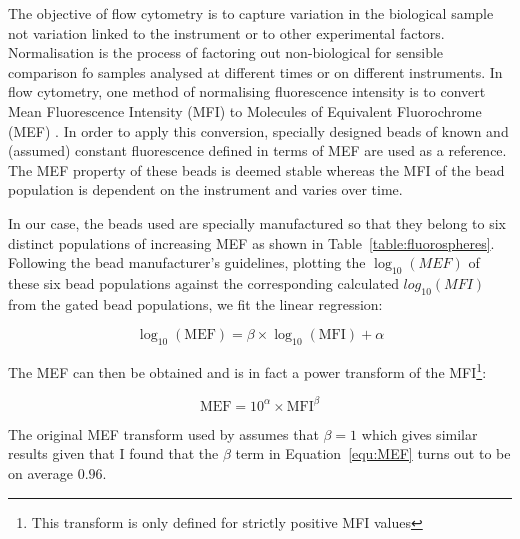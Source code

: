 
The objective of flow cytometry is to capture variation in the biological sample not variation linked to the instrument or to other experimental factors.
Normalisation is the process of factoring out non-biological for sensible comparison fo samples analysed at different times or on different instruments.
In flow cytometry, one method of normalising fluorescence intensity is to convert Mean Fluorescence Intensity (MFI)
to Molecules of Equivalent Fluorochrome (MEF) \citep{Schwartz:1996jj,Dendrou:2009bl}.
In order to apply this conversion, specially designed beads of known and (assumed) constant fluorescence defined in terms of MEF are used as a reference.
The MEF property of these beads is deemed stable whereas the MFI of the bead population is dependent on the instrument and varies over time.

In our case, the beads used are specially manufactured so that they belong to six distinct populations of increasing MEF as shown in Table~\ref{table:fluorospheres}.
Following the bead manufacturer's guidelines, plotting the $\log_{10}(MEF)$ of these six bead populations against
the corresponding calculated $log_{10}(MFI)$ from the gated bead populations, we fit the linear regression:

\begin{equation}
    \log_{10}(\text{MEF})=\beta  \times \log_{10}(\text{MFI}) + \alpha
\label{equ:MEF}
\end{equation}

The MEF can then be obtained and is in fact a power transform of the MFI\footnote{This transform is only defined for strictly positive MFI values}:


\[
    \text{MEF}= 10^\alpha \times \text{MFI}^\beta
\]



The original MEF transform used by \citet{Dendrou:2009bl} assumes that $\beta=1$ which
gives similar results given that I found that the $\beta$ term in Equation~\ref{equ:MEF} turns out to be on average $0.96$.


